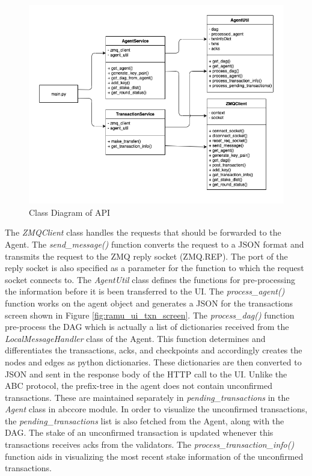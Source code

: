 \begin{figure}[htbp]
    \centering
    \includegraphics[width=0.9\linewidth]{figures/images/ramu/api_class.png}
	\caption{Class Diagram of API}
	\label{fig:ramu_api_class}
\end{figure}

The \textit{ZMQClient} class handles the requests that should be forwarded to the Agent. The \textit{send\_message()} function converts the request to a JSON format and transmits the request to the ZMQ reply socket (ZMQ.REP). The port of the reply socket is also specified as a parameter for the function to which the request socket connects to. The \textit{AgentUtil} class defines the functions for pre-processing the information before it is been transferred to the UI. The \textit{process\_agent()} function works on the agent object and generates a JSON for the transactions screen shown in Figure \ref{fig:ramu_ui_txn_screen}. The \textit{process\_dag()} function pre-process the DAG which is actually a list of dictionaries received from the \textit{LocalMessageHandler} class of the Agent. This function determines and differentiates the transactions, acks, and checkpoints and accordingly creates the nodes and edges as python dictionaries. These dictionaries are then converted to JSON and sent in the response body of the HTTP call to the UI. Unlike the ABC protocol, the prefix-tree in the agent does not contain unconfirmed transactions. These are maintained separately in \textit{pending\_transactions} in the \textit{Agent} class in abccore module. In order to visualize the unconfirmed transactions, the \textit{pending\_transactions} list is also fetched from the Agent, along with the DAG. The stake of an unconfirmed transaction is updated whenever this transactions receives acks from the validators. The \textit{process\_transaction\_info()} function aids in visualizing the most recent stake information of the unconfirmed transactions. 


